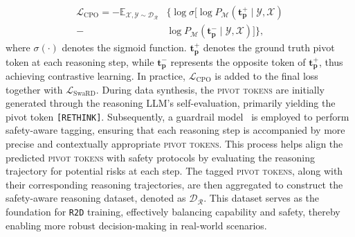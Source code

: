 \begin{equation}
\label{eq:cpo_loss}
\begin{aligned}
\mathcal{L}_{\text{CPO}} = -\mathbb{E}_{\mathcal{X, Y\sim D_R}}&\Big\{\log \sigma\big[\log P_\mathcal{M}(\mathbf{t_{p}^+} \mid \mathcal{Y,X}) \\
- &\log P_\mathcal{M}(\mathbf{t_{p}^-} \mid \mathcal{Y,X})\big]\Big\},
\end{aligned}
\end{equation}
where $\sigma(\cdot)$ denotes the sigmoid function. $\mathbf{t_{p}^+}$ denotes the ground truth pivot token at each reasoning step, while $\mathbf{t_{p}^-}$ represents the opposite token of $\mathbf{t_{p}^+}$, thus achieving contrastive learning. In practice, $\mathcal{L}_\text{CPO}$ is added to the final loss together with $\mathcal{L}_\text{SwaRD}$. During data synthesis, the \textsc{pivot tokens} are initially generated through the reasoning LLM's self-evaluation, primarily yielding the pivot token \texttt{[RETHINK]}. Subsequently, a guardrail model~\cite{inan2023llama} is employed to perform safety-aware tagging, ensuring that each reasoning step is accompanied by more precise and contextually appropriate \textsc{pivot tokens}. This process helps align the predicted \textsc{pivot tokens} with safety protocols by evaluating the reasoning trajectory for potential risks at each step. The tagged \textsc{pivot tokens}, along with their corresponding reasoning trajectories, are then aggregated to construct the safety-aware reasoning dataset, denoted as $\mathcal{D_R}$. This dataset serves as the foundation for \texttt{R2D} training, effectively balancing capability and safety, thereby enabling more robust decision-making in real-world scenarios.

